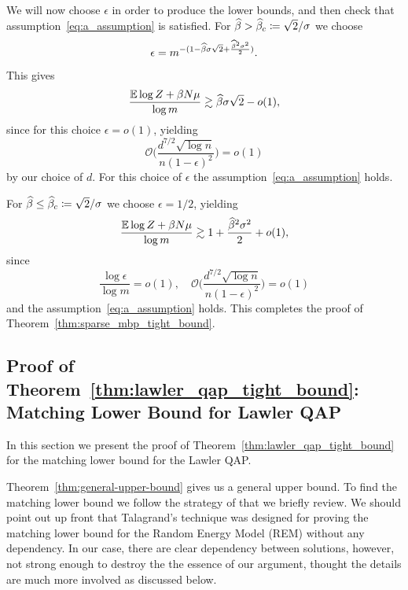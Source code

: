 We will now choose $\epsilon$ in order to produce the lower bounds, and
then check that assumption~\eqref{eq:a_assumption} is  satisfied.
For $\widehat{\beta} > \widehat{\beta}_c \coloneqq \sqrt{2}/\sigma$ we choose 
$$\epsilon = m^{-(1-\widehat{\beta} \sigma \sqrt{2} + \frac{\widehat{\beta}^2\sigma^2}{2})}.$$
This gives 
\begin{equation}\label{eq:expct_log_z_lin_lowerbound}
\frac{\mathbb{E} \log Z + \beta N \mu}{\log m} 
    \gtrsim \widehat{\beta} \sigma \sqrt{2} - o(1),
\end{equation}
since for this choice $\epsilon = o(1)$, yielding 
\begin{equation}
  \mathcal{O} \biggl( \frac{d^{7/2} \sqrt{\log n}}{n (1-\epsilon)^2} \biggr) 
    = o(1)
\end{equation}
by our choice of $d$.
For this choice of $\epsilon$ the assumption~\eqref{eq:a_assumption} holds.


For $\widehat{\beta} \le \widehat{\beta}_c \coloneqq \sqrt{2}/\sigma$ we choose $\epsilon = 1/2$, yielding 
\begin{equation}\label{eq:expct_log_z_quad_lowerbound}
  \frac{\mathbb{E} \log Z + \beta N \mu}{\log m} 
    \gtrsim 1 + \frac{\widehat{\beta}^2 \sigma^2}{2} + o(1),
\end{equation}
since
\begin{equation}
  \frac{\log\epsilon}{\log m} = o(1), \quad 
  \mathcal{O} \Biggl( \frac{d^{7/2} \sqrt{\log n}}{n (1-\epsilon)^2} \Biggr) 
    = o(1)
\end{equation}
and the assumption~\eqref{eq:a_assumption}  holds.
This completes the proof of Theorem~\ref{thm:sparse_mbp_tight_bound}.
\QEDA

\subsection{Proof of Theorem~\ref{thm:lawler_qap_tight_bound}: Matching Lower 
Bound for Lawler QAP}
\label{sec:free_lqap_lowerbound_proof}

In this section we present the proof of 
Theorem~\ref{thm:lawler_qap_tight_bound} for
the matching lower bound for the Lawler QAP.

Theorem~\ref{thm:general-upper-bound} gives us a general upper
bound. To find the matching lower bound we follow the strategy of \cite{talagrand03}
that we briefly review. We should point out up front that Talagrand's
technique was designed for proving the matching lower bound for 
the Random Energy Model (REM) without any dependency. In our case, there are
clear dependency between solutions, however, not strong enough to destroy the 
the essence of our argument, thought the details are much more involved as
discussed below.

